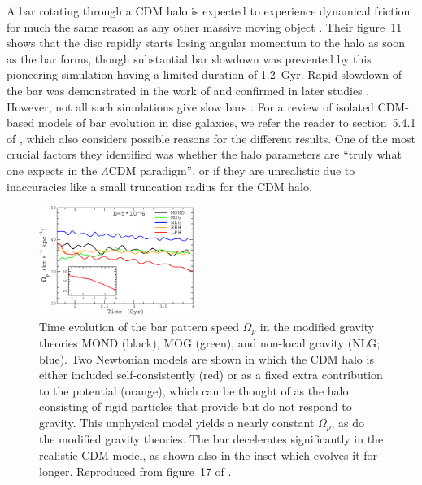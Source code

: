 \documentclass[fleqn,usenatbib,useAMS,onecolumn]{mnras} %
\begin{document}
A bar rotating through a CDM halo is expected to experience dynamical friction for much the same reason as any other massive moving object \citep{Sellwood_1980}. Their figure~11 shows that the disc rapidly starts losing angular momentum to the halo as soon as the bar forms, though substantial bar slowdown was prevented by this pioneering simulation having a limited duration of 1.2~Gyr. Rapid slowdown of the bar was demonstrated in the work of \citet{Weinberg_1985} and confirmed in later studies \citep{Debattista_1998, Debattista_2000, Holley_2005, Klypin_2009}. However, not all such simulations give slow bars \citep[e.g.][]{Athanassoula_2003, Athanassoula_2013}. For a review of isolated CDM-based models of bar evolution in disc galaxies, we refer the reader to section~5.4.1 of \citet{Roshan_2021_disc_stability}, which also considers possible reasons for the different results. One of the most crucial factors they identified was whether the halo parameters are ``truly what one expects in the $\Lambda$CDM paradigm'', or if they are unrealistic due to inaccuracies like a small truncation radius for the CDM halo.

\begin{figure}
	\centering
	\includegraphics[width=0.45\textwidth]{Roshan_2021_disc_stability_Figure_17}
	\caption{Time evolution of the bar pattern speed $\Omega_p$ in the modified gravity theories MOND (black), MOG (green), and non-local gravity (NLG; blue). Two Newtonian models are shown in which the CDM halo is either included self-consistently (red) or as a fixed extra contribution to the potential (orange), which can be thought of as the halo consisting of rigid particles that provide but do not respond to gravity. This unphysical model yields a nearly constant $\Omega_p$, as do the modified gravity theories. The bar decelerates significantly in the realistic CDM model, as shown also in the inset which evolves it for longer. Reproduced from figure~17 of \citet{Roshan_2021_disc_stability}.}
	\label{Roshan_2021_disc_stability_Figure_Omega_p}
\end{figure}
\end{document}
